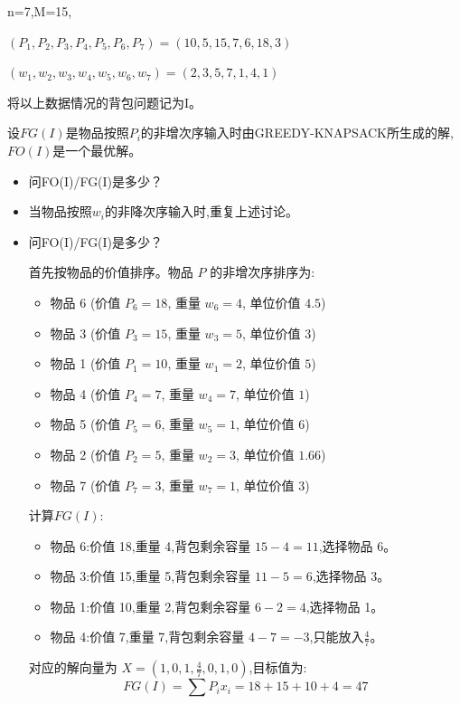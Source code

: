 \documentclass[../../main.tex]{subfiles}
\begin{document}
\begin{problem}
    n=7,M=15,

    \((P_1,P_2,P_3,P_4,P_5,P_6,P_7)=(10,5,15,7,6,18,3)\)

    \((w_1,w_2,w_3,w_4,w_5,w_6,w_7)=(2,3,5,7,1,4,1)\)

    将以上数据情况的背包问题记为I。
    
    设\(FG(I)\)是物品按照\(P_i\)的非增次序输入时由GREEDY-KNAPSACK所生成的解,\(FO(I)\)是一个最优解。
\begin{itemize}
    \item 问FO(I)/FG(I)是多少？
    \item 当物品按照\(w_i\)的非降次序输入时,重复上述讨论。
\end{itemize}
\end{problem}
\begin{solution}
\begin{itemize}
    \item 问FO(I)/FG(I)是多少？

首先按物品的价值排序。物品 \( P \) 的非增次序排序为:
\begin{itemize}
    \item 物品 6 (价值 \( P_6 = 18 \), 重量 \( w_6 = 4 \), 单位价值 \(4.5 \))
    \item 物品 3 (价值 \( P_3 = 15 \), 重量 \( w_3 = 5 \), 单位价值 \(3   \))
    \item 物品 1 (价值 \( P_1 = 10 \), 重量 \( w_1 = 2 \), 单位价值 \(5   \))
    \item 物品 4 (价值 \( P_4 =  7 \), 重量 \( w_4 = 7 \), 单位价值 \(1   \))
    \item 物品 5 (价值 \( P_5 =  6 \), 重量 \( w_5 = 1 \), 单位价值 \(6   \))
    \item 物品 2 (价值 \( P_2 =  5 \), 重量 \( w_2 = 3 \), 单位价值 \(1.66\))
    \item 物品 7 (价值 \( P_7 =  3 \), 重量 \( w_7 = 1 \), 单位价值 \(3   \))
\end{itemize}
计算\(FG(I)\):
\begin{itemize}
\item[(1)] 物品 6:价值 18,重量 4,背包剩余容量 \( 15 - 4 = 11 \),选择物品 6。
\item[(2)] 物品 3:价值 15,重量 5,背包剩余容量 \( 11 - 5 = 6 \),选择物品 3。
\item[(3)] 物品 1:价值 10,重量 2,背包剩余容量 \( 6 - 2 = 4 \),选择物品 1。
\item[(4)] 物品 4:价值 7,重量 7,背包剩余容量 \( 4 - 7 = -3 \),只能放入\(\frac{4}{7}\)。
\end{itemize}
对应的解向量为 \( X = (1, 0, 1, \frac{4}{7}, 0, 1, 0) \),目标值为:
\[
FG(I) = \sum P_i x_i = 18 + 15 + 10 + 4= 47
\]


\end{itemize}
\end{solution}
\end{document}
